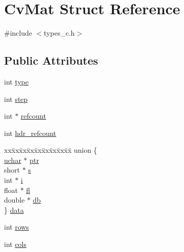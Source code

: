 \hypertarget{structCvMat}{\section{Cv\-Mat Struct Reference}
\label{structCvMat}
}


{\ttfamily \#include $<$types\-\_\-c.\-h$>$}

\subsection*{Public Attributes}
\begin{DoxyCompactItemize}
\item 
int \hyperlink{structCvMat_acb651f3eaeb6ee5e9c23308a91aba936}{type}
\item 
int \hyperlink{structCvMat_a79ac05ef6fed1529e6d4b444c7c5234c}{step}
\item 
int $\ast$ \hyperlink{structCvMat_af54d7348d15fd7475d85adf0d7e71439}{refcount}
\item 
int \hyperlink{structCvMat_a1f984bbb5329fbfd7b8230ca2f63e62e}{hdr\-\_\-refcount}
\item 
\begin{tabbing}
xx\=xx\=xx\=xx\=xx\=xx\=xx\=xx\=xx\=\kill
union \{\\
\>\hyperlink{core_2types__c_8h_a65f85814a8290f9797005d3b28e7e5fc}{uchar} $\ast$ \hyperlink{structCvMat_a788228568bc88fbfd4ccae75a9d01585}{ptr}\\
\>short $\ast$ \hyperlink{structCvMat_a90df732557ba0842a10b47bc85f8dcbe}{s}\\
\>int $\ast$ \hyperlink{structCvMat_acdf5cf8c58ab40a5602235d954440563}{i}\\
\>float $\ast$ \hyperlink{structCvMat_a7015f3f7b174d073303fe96359ec5a5a}{fl}\\
\>double $\ast$ \hyperlink{structCvMat_a7ed7f844011cc42ca5b338ae3cf4eb83}{db}\\
\} \hyperlink{structCvMat_af4a5c6f05447bd400a4e1246ffe685af}{data}\\

\end{tabbing}\item 
int \hyperlink{structCvMat_a1048c94607682732dc75d367f7777222}{rows}
\item 
int \hyperlink{structCvMat_ad3706bc15c75d94d1a938172b2f790b5}{cols}
\end{DoxyCompactItemize}


